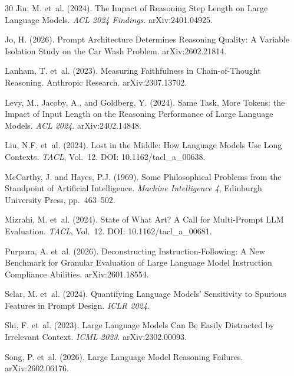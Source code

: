 \documentclass[11pt]{article}
\begin{document}
\begin{thebibliography}{30}
Jin, M. et~al. (2024).
\newblock The Impact of Reasoning Step Length on Large Language Models.
\newblock \textit{ACL 2024 Findings}. arXiv:2401.04925.

Jo, H. (2026).
\newblock Prompt Architecture Determines Reasoning Quality: A Variable Isolation Study on the Car Wash Problem.
\newblock arXiv:2602.21814.

Lanham, T. et~al. (2023).
\newblock Measuring Faithfulness in Chain-of-Thought Reasoning.
\newblock Anthropic Research. arXiv:2307.13702.

Levy, M., Jacoby, A., and Goldberg, Y. (2024).
\newblock Same Task, More Tokens: the Impact of Input Length on the Reasoning Performance of Large Language Models.
\newblock \textit{ACL 2024}. arXiv:2402.14848.

Liu, N.F. et~al. (2024).
\newblock Lost in the Middle: How Language Models Use Long Contexts.
\newblock \textit{TACL}, Vol.~12. DOI: 10.1162/tacl\_a\_00638.

McCarthy, J. and Hayes, P.J. (1969).
\newblock Some Philosophical Problems from the Standpoint of Artificial Intelligence.
\newblock \textit{Machine Intelligence 4}, Edinburgh University Press, pp.~463--502.

Mizrahi, M. et~al. (2024).
\newblock State of What Art? A Call for Multi-Prompt LLM Evaluation.
\newblock \textit{TACL}, Vol.~12. DOI: 10.1162/tacl\_a\_00681.

Purpura, A. et~al. (2026).
\newblock Deconstructing Instruction-Following: A New Benchmark for Granular Evaluation of Large Language Model Instruction Compliance Abilities.
\newblock arXiv:2601.18554.

Sclar, M. et~al. (2024).
\newblock Quantifying Language Models' Sensitivity to Spurious Features in Prompt Design.
\newblock \textit{ICLR 2024}.

Shi, F. et~al. (2023).
\newblock Large Language Models Can Be Easily Distracted by Irrelevant Context.
\newblock \textit{ICML 2023}. arXiv:2302.00093.

Song, P. et~al. (2026).
\newblock Large Language Model Reasoning Failures.
\newblock arXiv:2602.06176.


\end{thebibliography}
\end{document}
